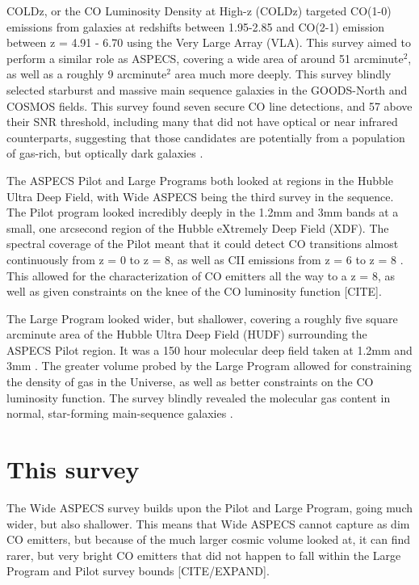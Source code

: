 COLDz, or the CO Luminosity Density at High-z (COLDz) targeted CO(1-0) emissions from galaxies at redshifts between 1.95-2.85 and CO(2-1) emission between z = 4.91 - 6.70 using the Very Large Array (VLA)\cite{pavesi2018co}. This survey aimed to perform a similar role as ASPECS, covering a wide area of around 51 arcminute$^2$, as well as a roughly 9 arcminute$^2$ area much more deeply. This survey blindly selected starburst and massive main sequence galaxies in the GOODS-North and COSMOS fields. This survey found seven secure CO line detections, and 57 above their SNR threshold, including many that did not have optical or near infrared counterparts, suggesting that those candidates are potentially from a population of gas-rich, but optically dark galaxies \cite{pavesi2018co}.

The ASPECS Pilot and Large Programs both looked at regions in the Hubble Ultra Deep Field, with Wide ASPECS being the third survey in the sequence. The Pilot program looked incredibly deeply in the 1.2mm and 3mm bands at a small, one arcsecond region of the Hubble eXtremely Deep Field (XDF). The spectral coverage of the Pilot meant that it could detect CO transitions almost continuously from z = 0 to z = 8, as well as CII emissions from z = 6 to z = 8 \cite{walter2016alma}. This allowed for the characterization of CO emitters all the way to a z = 8, as well as given constraints on the knee of the CO luminosity function [CITE]. 

The Large Program looked wider, but shallower, covering a roughly five square arcminute area of the Hubble Ultra Deep Field (HUDF) surrounding the ASPECS Pilot region. It was a 150 hour molecular deep field taken at 1.2mm and 3mm \cite{decarli2019alma}.  The greater volume probed by the Large Program allowed for constraining the density of gas in the Universe, as well as better constraints on the CO luminosity function. The survey blindly revealed the molecular gas content in normal, star-forming main-sequence galaxies \cite{decarli2019alma}. 

\section{This survey}

The Wide ASPECS survey builds upon the Pilot and Large Program, going much wider, but also shallower. This means that Wide ASPECS cannot capture as dim CO emitters, but because of the much larger cosmic volume looked at, it can find rarer, but very bright CO emitters that did not happen to fall within the Large Program and Pilot survey bounds [CITE/EXPAND]. 


